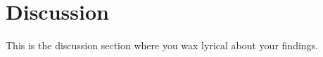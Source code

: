 \section*{Discussion}\label{sec:discussion}

This is the discussion section where you wax lyrical about your findings.













